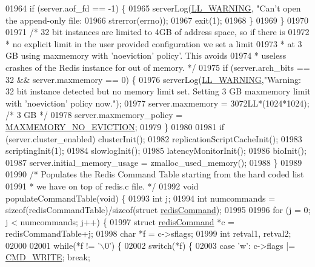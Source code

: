 \begin{DoxyCode}
{{{{{{{{{{{{{{{{{{{{{{{{{{{{01964         \textcolor{keywordflow}{if} (server.aof\_fd == -1) \{
01965             serverLog(\hyperlink{server_8h_a31229b9334bba7d6be2a72970967a14b}{LL\_WARNING}, \textcolor{stringliteral}{"Can't open the append-only file: %
01966                 strerror(errno));
01967             exit(1);
01968         \}
01969     \}
01970 
01971     \textcolor{comment}{/* 32 bit instances are limited to 4GB of address space, so if there is}
01972 \textcolor{comment}{     * no explicit limit in the user provided configuration we set a limit}
01973 \textcolor{comment}{     * at 3 GB using maxmemory with 'noeviction' policy'. This avoids}
01974 \textcolor{comment}{     * useless crashes of the Redis instance for out of memory. */}
01975     \textcolor{keywordflow}{if} (server.arch\_bits == 32 && server.maxmemory == 0) \{
01976         serverLog(\hyperlink{server_8h_a31229b9334bba7d6be2a72970967a14b}{LL\_WARNING},\textcolor{stringliteral}{"Warning: 32 bit instance detected but no memory limit set.
       Setting 3 GB maxmemory limit with 'noeviction' policy now."});
01977         server.maxmemory = 3072LL*(1024*1024); \textcolor{comment}{/* 3 GB */}
01978         server.maxmemory\_policy = \hyperlink{server_8h_a418e5a222cf659c003df77830f1ae343}{MAXMEMORY\_NO\_EVICTION};
01979     \}
01980 
01981     \textcolor{keywordflow}{if} (server.cluster\_enabled) clusterInit();
01982     replicationScriptCacheInit();
01983     scriptingInit(1);
01984     slowlogInit();
01985     latencyMonitorInit();
01986     bioInit();
01987     server.initial\_memory\_usage = zmalloc\_used\_memory();
01988 \}
01989 
01990 \textcolor{comment}{/* Populates the Redis Command Table starting from the hard coded list}
01991 \textcolor{comment}{ * we have on top of redis.c file. */}
01992 \textcolor{keywordtype}{void} populateCommandTable(\textcolor{keywordtype}{void}) \{
01993     \textcolor{keywordtype}{int} j;
01994     \textcolor{keywordtype}{int} numcommands = \textcolor{keyword}{sizeof}(redisCommandTable)/\textcolor{keyword}{sizeof}(\textcolor{keyword}{struct} \hyperlink{structredisCommand}{redisCommand});
01995 
01996     \textcolor{keywordflow}{for} (j = 0; j < numcommands; j++) \{
01997         \textcolor{keyword}{struct} \hyperlink{structredisCommand}{redisCommand} *c = redisCommandTable+j;
01998         \textcolor{keywordtype}{char} *f = c->sflags;
01999         \textcolor{keywordtype}{int} retval1, retval2;
02000 
02001         \textcolor{keywordflow}{while}(*f != \textcolor{stringliteral}{'\(\backslash\)0'}) \{
02002             \textcolor{keywordflow}{switch}(*f) \{
02003             \textcolor{keywordflow}{case} \textcolor{stringliteral}{'w'}: c->flags |= \hyperlink{server_8h_a7391deb9c3a262ded3e186e94eb884e2}{CMD\_WRITE}; \textcolor{keywordflow}{break};
}}}}}}}}}}}}}}}}}}}}}}}}}}}}}
\end{DoxyCode}
